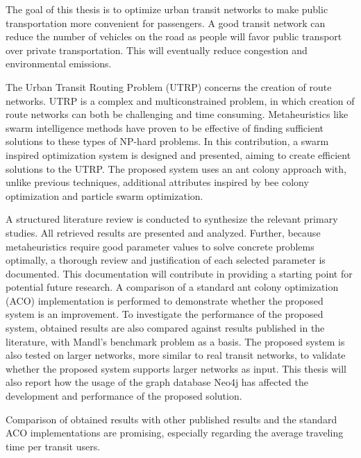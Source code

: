 

The goal of this thesis is to optimize urban transit networks to make public transportation more convenient for passengers. A good transit network can reduce the number of vehicles on the road as people will favor public transport over private transportation. This will eventually reduce congestion and environmental emissions.

The Urban Transit Routing Problem (UTRP) concerns the creation of route networks. UTRP is a complex and multiconstrained problem, in which creation of route networks can both be challenging and time consuming. Metaheuristics like swarm intelligence methods have proven to be effective of finding sufficient solutions to these types of NP-hard problems. In this contribution, a swarm inspired optimization system is designed and presented, aiming to create efficient solutions to the UTRP. The proposed system uses an ant colony approach with, unlike previous techniques, additional attributes inspired by bee colony optimization and particle swarm optimization. 

A structured literature review is conducted to synthesize the relevant primary studies. All retrieved results are presented and analyzed. Further, because metaheuristics require good parameter values to solve concrete problems optimally, a thorough review and justification of each selected parameter is documented. This documentation will contribute in providing a starting point for potential future research. A comparison of a standard ant colony optimization (ACO) implementation is performed to demonstrate whether the proposed system is an improvement. To investigate the performance of the proposed system, obtained results are also compared against results published in the literature, with Mandl's benchmark problem as a basis.  The proposed system is also tested on larger networks, more similar to real transit networks, to validate whether the proposed system supports larger networks as input. This thesis will also report how the usage of the graph database Neo4j has affected the development and performance of the proposed solution.  

Comparison of obtained results with other published results and the standard ACO implementations are promising, especially regarding the average traveling time per transit users. 



